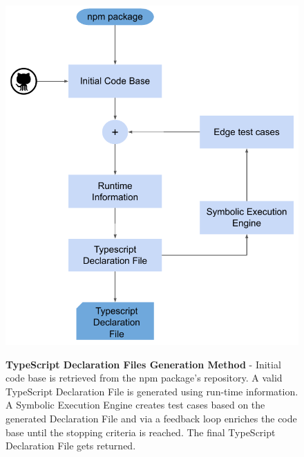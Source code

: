 \begin{figure}[t]
\begin{centering}
    {\includegraphics[scale=0.9]{figures/approach/typescript-declaration-files-generation-method/typescript_declaration_files_generation_method_block_diagram.pdf}}
    \caption[TypeScript Declaration Files Generation Method]{\textbf{TypeScript Declaration Files Generation Method} - Initial code base is retrieved from the npm package's repository. A valid TypeScript Declaration File is generated using run-time information. A Symbolic Execution Engine creates test cases based on the generated Declaration File and via a feedback loop enriches the code base until the stopping criteria is reached. The final TypeScript Declaration File gets returned.}
    \label{fig:tsd_generation_method_block_diagram}
\end{centering}
\end{figure}
